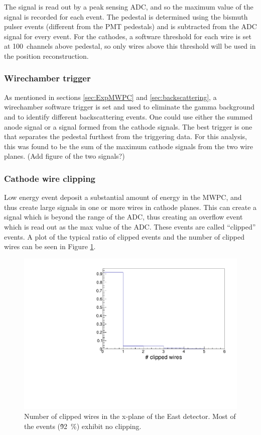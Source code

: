 The signal is read out by a peak sensing ADC, and so the maximum value of the signal is recorded
for each event. The pedestal is determined using the bismuth pulser events (different from the
PMT pedestals) and is subtracted from the ADC signal for every event. For the cathodes, a software
threshold for each wire is set at 100~channels above pedestal, so only wires above this threshold
will be used in the position reconstruction.

\subsubsection{Wirechamber trigger} \label{sssec:mwpctrigg}

As mentioned in sections \ref{sec:ExpMWPC} and \ref{sec:backscattering}, a wirechamber
software trigger is set and used to eliminate the gamma background and to identify different
backscattering events. One could use either the summed anode signal or a signal formed from
the cathode signals. The best trigger is one that separates the pedestal furthest from the
triggering data. For this analysis, this was found to be the sum of the maximum cathode
signals from the two wire planes. (Add figure of the two signals?)

\subsubsection{Cathode wire clipping}

Low energy event deposit a substantial amount of energy in the MWPC, and thus create large
signals in one or more wires in cathode planes. This can create a signal which is beyond the
range of the ADC, thus creating an overflow event which is read out as the max value of the ADC.
These events are called ``clipped'' events. A plot of the typical ratio of clipped events and the
number of clipped wires can be seen in Figure \ref{fig:nClipped}.

\begin{figure}[h]
  \centering
  \includegraphics[scale=0.6,page=1]{4-UCNACalibrations/mwpc_position.pdf} 
  \caption{Number of clipped wires in the x-plane of the East detector. Most of the events
    (\~92~\%) exhibit no clipping.}
  \label{fig:nClipped}
\end{figure}


